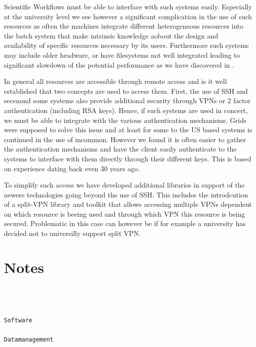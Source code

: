 \documentclass[utf8]{FrontiersinVancouver} %
\begin{document}
Scientific Workflows must be able to interface with such systems
easily. Especially at the university level we see however a
significant complication in the use of such resources as often the
machines integrate different heterogeneous resources into the batch
system that make intrinsic knowledge aobout the design and
availability of specific resources necessary by its users. Furthermore
such systems may include older hradware, or have filesystems not well
integrated leading to significant slowdown of the potential
performance as we have discovered in \citep{earthquake?}.

In general all resources are accessible through remote access and is
it well established that two concepts are used to access them. First,
the use of SSH and secenond some systems also provide additional
security through VPNs or 2 factor authentication (including RSA
keys). Hence, if such systems are used in concert, we must be able to
integrate with the various authentication mechanisms. Grids were
supposed to solve this issue and at least for some to the US based
systems is continued in the use of incommon. However we found it is
often easier to gather the authentication mechanisms and have the
client easily authenticate to the systems to interface with them
directly through their different keys. This is based on experience
dating back even 30 years ago.

To simplify such access we have developed additional libraries in
support of the newere technologies going beyond the use of SSH. This
includes the introdcution of a split-VPN library and toolkit that
allows accessing multiple VPNs dependent on which resource is beeing
used and through which VPN this resource is being secured. Problematic
in this case can however be if for example a university has decided
not to universilly support split VPN.








\section{Notes}

\begin{verbatim}  



Software

Datamanagement

\end{verbatim}
\end{document}
